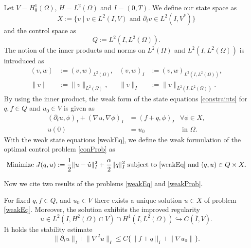Let $V=H_0^1(\Omega)$, $H=L^2(\Omega)$ and $I=(0,T)$. We define our state space as
\begin{displaymath}
X:=\{v\mid v\in L^2(I,V)\text{ and }\partial_tv\in L^2(I,V^*)\}
\end{displaymath}
and the control space as
\begin{displaymath}
Q:=L^2(I,L^2(\Omega)).
\end{displaymath}
The notion of the inner products and norms on $L^2(\Omega)$ and $L^2(I,L^2(\Omega))$ is introduced as
\begin{align*}
(v,w)&:=(v,w)_{L^2(\Omega)},&(v,w)_I&:=(v,w)_{L^2(I,L^2(\Omega))},\\
\|v\|&:=\|v\|_{L^2(\Omega)},&\|v\|_I&:=\|v\|_{L^2(I,L^2(\Omega))}.
\end{align*}
By using the inner product, the weak form of the state equations \eqref{constraints} for $q,f\in Q$ and $u_0\in V$ is given as
\begin{equation}
\label{weakEq}
\begin{aligned}
	(\partial_tu,\phi)_I+(\nabla u,\nabla\phi)_I&=(f+q,\phi)_I&\forall\phi\in X,\\
	u(0)&=u_0&\text{ in }\Omega.
\end{aligned}
\end{equation}
With the weak state equations \eqref{weakEq}, we define the weak formulation of the optimal control problem \eqref{conProb} as
\begin{equation}
\label{weakProb}
\text{Minimize }J(q,u):=\frac{1}{2}\|u-\hat{u}\|_I^2+\frac{\alpha}{2}\|q\|_I^2\text{ subject to \eqref{weakEq} and }(q,u)\in Q\times X.
\end{equation}

Now we cite two results of the problems \eqref{weakEq} and \eqref{weakProb}.

\begin{prop}
\label{uniqueU}
For fixed $q,f\in Q$, and $u_0\in V$ there exists a unique solution $u\in X$ of problem \eqref{weakEq}. Moreover, the solution exhibits the improved regularity
\begin{displaymath}
u\in L^2(I,H^2(\Omega)\cap V)\cap H^1(I,L^2(\Omega))\hookrightarrow C(\bar{I},V).
\end{displaymath}
It holds the stability estimate
\begin{displaymath}
\|\partial_tu\|_I+\|\nabla^2u\|_I\leq C\{\|f+q\|_I+\|\nabla u_0\|\}.
\end{displaymath}
\end{prop}

